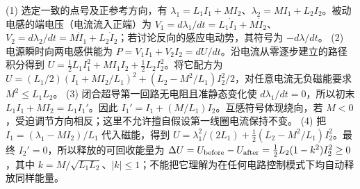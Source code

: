 (1) 选定一致的点号及正参考方向，有 \(\lambda_1=L_1I_1+MI_2\)、\(\lambda_2=MI_1+L_2I_2\)。被动电感的端电压（电流流入正端）为 \(V_1=d\lambda_1/dt=L_1\dot I_1+M\dot I_2\)、\(V_2=d\lambda_2/dt=M\dot I_1+L_2\dot I_2\)；若讨论反向的感应电动势，其符号为 \(-d\lambda/dt\)。
(2) 电源瞬时向两电感供能为 \(P=V_1I_1+V_2I_2=dU/dt\)。沿电流从零逐步建立的路径积分得到 \(U=\tfrac12L_1I_1^2+MI_1I_2+\tfrac12L_2I_2^2\)。将它配方为 \(U=(L_1/2)(I_1+MI_2/L_1)^2+(L_2-M^2/L_1)I_2^2/2\)，对任意电流无负磁能要求 \(M^2\le L_1L_2\)。
(3) 闭合超导第一回路无电阻且准静态变化使 \(d\lambda_1/dt=0\)，所以初末 \(L_1I_1+MI_2=L_1I_1'\)。因此 \(I_1'=I_1+(M/L_1)I_2\)。互感符号体现绕向，若 \(M<0\)，受迫调节方向相反；这里不允许擅自假设第一线圈电流保持不变。
(4) 把 \(I_1=(\lambda_1-MI_2)/L_1\) 代入磁能，得到 \(U=\lambda_1^2/(2L_1)+\tfrac12(L_2-M^2/L_1)I_2^2\)。最终 \(I_2'=0\)，所以释放的可回收能量为 \(\Delta U=U_{\rm before}-U_{\rm after}=\tfrac12L_2(1-k^2)I_2^2\ge0\)，其中 \(k=M/\sqrt{L_1L_2}\)、\(|k|\le1\)；不能把它理解为在任何电路控制模式下均自动释放同样能量。
